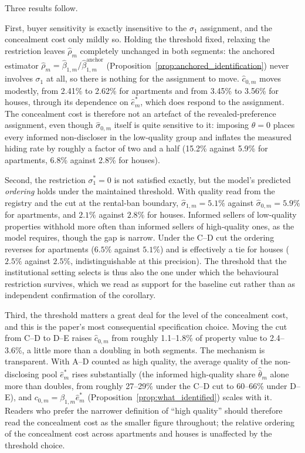 Three results follow.

First, buyer sensitivity is exactly insensitive to the $\sigma_1$ assignment, and the
concealment cost only mildly so. Holding the threshold fixed, relaxing the restriction leaves
$\hat\rho_m$ completely unchanged in both segments: the anchored estimator
$\hat\rho_m=\hat\beta_{1,m}/\hat\beta_{1,m}^{\mathrm{anchor}}$ (Proposition~\ref{prop:anchored_identification})
never involves $\sigma_1$ at all, so there is nothing for the assignment to move. $\hat
c_{0,m}$ moves modestly, from 2.41\% to 2.62\% for apartments and from 3.45\% to 3.56\% for
houses, through its dependence on $\hat e^*_m$, which does respond to the assignment. The
concealment cost is therefore not an artefact of the revealed-preference assignment, even
though $\hat\sigma_{0,m}$ itself is quite sensitive to it: imposing $\theta=0$ places every
informed non-discloser in the low-quality group and inflates the measured hiding rate by
roughly a factor of two and a half (15.2\% against 5.9\% for apartments, 6.8\% against 2.8\%
for houses).

Second, the restriction $\sigma_1^*=0$ is not satisfied exactly, but the model's predicted
\emph{ordering} holds under the maintained threshold. With quality read from the registry and
the cut at the rental-ban boundary, $\hat\sigma_{1,m} = 5.1\%$ against
$\hat\sigma_{0,m} = 5.9\%$ for apartments, and $2.1\%$ against $2.8\%$ for houses. Informed
sellers of low-quality properties withhold more often than informed sellers of high-quality
ones, as the model requires, though the gap is narrow. Under the C--D cut the ordering
reverses for apartments ($6.5\%$ against $5.1\%$) and is effectively a tie for houses ($2.5\%$
against $2.5\%$, indistinguishable at this precision). The threshold that the institutional
setting selects is thus also the one under which the behavioural restriction survives, which
we read as support for the baseline cut rather than as independent confirmation of the
corollary.

Third, the threshold matters a great deal for the level of the concealment cost, and this is
the paper's most consequential specification choice. Moving the cut from C--D to D--E raises
$\hat c_{0,m}$ from roughly 1.1--1.8\% of property value to 2.4--3.6\%, a little more than a
doubling in both segments. The mechanism is transparent. With A--D counted as high quality,
the average quality of the non-disclosing pool $\hat e^*_m$ rises substantially (the informed
high-quality share $\hat{\bar\theta}_m$ alone more than doubles, from roughly 27--29\% under
the C--D cut to 60--66\% under D--E), and $c_{0,m}=\beta_{1,m}\hat e^*_m$
(Proposition~\ref{prop:what_identified}) scales with it. Readers who prefer the narrower
definition of ``high quality'' should therefore read the concealment cost as the smaller
figure throughout; the relative ordering of the concealment cost across apartments and houses
is unaffected by the threshold choice.

